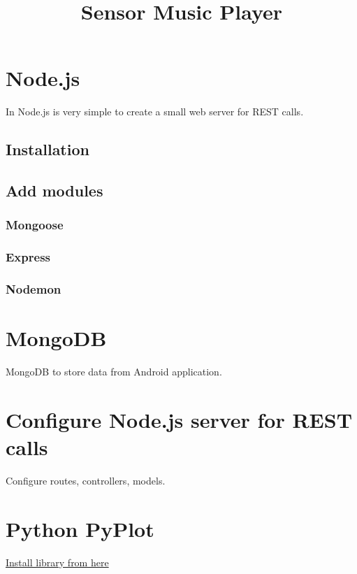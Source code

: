 \documentclass[12pt]{article}
\title{\textbf{Sensor Music Player}}
\begin{document}
\maketitle
\newpage

\tableofcontents
\newpage

\section{Node.js}
In Node.js is very simple to create a small web server for REST calls.
\subsection{Installation}
\subsection{Add modules}
\subsubsection{Mongoose}
\subsubsection{Express}
\subsubsection{Nodemon}

\section{MongoDB}
MongoDB to store data from Android application.

\section{Configure Node.js server for REST calls}
Configure routes, controllers, models.

\section{Python PyPlot}
\href{https://matplotlib.org/users/installing.html#linux-using-your-package-manager}{Install library from here}
\end{document}
